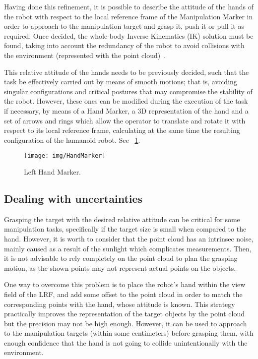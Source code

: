 		Having done this refinement, it is possible to describe the attitude of the hands of the robot with respect
		to the local reference frame of the Manipulation Marker in order to approach to the manipulation target and
		grasp it, push it or pull it as required.
		Once decided, the whole-body Inverse Kinematics (IK) solution must be found, taking into account the redundancy
		of the robot to avoid collisions with the environment (represented with the point cloud)~\cite{Kanoun}.
		
		This relative attitude of the hands needs to be previously decided, such that the task be effectively carried
		out by means of smooth motions; that is, avoiding singular configurations and critical postures that may
		compromise the stability of the robot.
		However, these ones can be modified during the execution of the task if necessary, by means of a Hand Marker,
		a 3D representation of the hand and a set of arrows and rings which allow the operator to translate and rotate it
		with respect to its local reference frame, calculating at the same time the resulting configuration of the
		humanoid robot.
		See \figurename~\ref{fig:HandMarker}.
		
		\begin{figure}[b]
			\centering
			\texttt{[image: img/HandMarker]}
			\caption{Left Hand Marker.}
			\label{fig:HandMarker}
		\end{figure}
		
	\subsection{Dealing with uncertainties}
		\label{sub:uncertainties}
		
		Grasping the target with the desired relative attitude can be critical for some manipulation tasks,
		specifically if the target size is small when compared to the hand.
		However, it is worth to consider that the point cloud has an intrinsec noise, mainly caused as a result of the
		sunlight which complicates measurements.
		Then, it is not advisable to rely completely on the point cloud to plan the grasping motion,
		as the shown points may not represent actual points on the objects.
		
		One way to overcome this problem is to place the robot's hand within the view field of the LRF,
		and add some offset to the point cloud in order to match the corresponding points with the hand,
		whose attitude is known.
		This strategy practically improves the representation of the target objects by the point cloud but
		the precision may not be high enough.
		However, it can be used to approach to the manipulation targets (within some centimeters) before grasping them,
		with enough confidence that the hand is not going to collide unintentionally with the environment.
		

